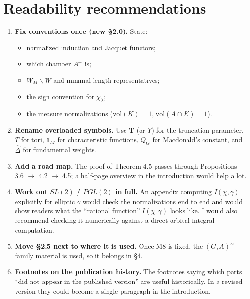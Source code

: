 \documentclass[11pt]{article}
\begin{document}
\section{Readability recommendations}
\begin{enumerate}
\item \textbf{Fix conventions once (new \S2.0).} State:
  \begin{itemize}
  \item normalized induction and Jacquet functors;
  \item which chamber $A^-$ is;
  \item $W_M\backslash W$ and minimal-length representatives;
  \item the sign convention for $\chi_\lambda$;
  \item the measure normalizations ($\mathrm{vol}(K)=1$, $\mathrm{vol}(A\cap K)=1$).
  \end{itemize}
\item \textbf{Rename overloaded symbols.} Use $\mathbf{T}$ (or $Y$) for the truncation parameter, $T$ for tori, $\mathbf 1_M$ for characteristic functions, $Q_G$ for Macdonald's constant, and $\hat\Delta$ for fundamental weights.
\item \textbf{Add a road map.} The proof of Theorem 4.5 passes through Propositions 3.6 $\to$ 4.2 $\to$ 4.5; a half-page overview in the introduction would help a lot.
\item \textbf{Work out $SL(2)$ / $PGL(2)$ in full.} An appendix computing $I(\chi,\gamma)$ explicitly for elliptic $\gamma$ would check the normalizations end to end and would show readers what the ``rational function'' $I(\chi,\gamma)$ looks like. I would also recommend checking it numerically against a direct orbital-integral computation.
\item \textbf{Move \S2.5 next to where it is used.} Once M8 is fixed, the $(G,A)^\sim$-family material is used, so it belongs in \S4.
\item \textbf{Footnotes on the publication history.} The footnotes saying which parts ``did not appear in the published version'' are useful historically. In a revised version they could become a single paragraph in the introduction.
\end{enumerate}
\end{document}
